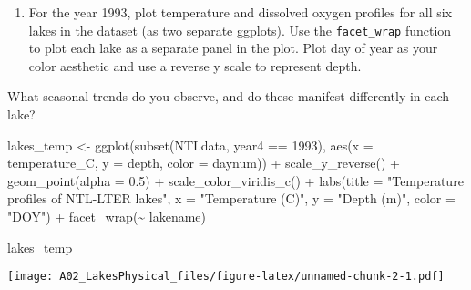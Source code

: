 \documentclass[
]{article}
\newenvironment{Shaded}{\begin{snugshade}}{\end{snugshade}}
\newcommand{\AttributeTok}[1]{\textcolor[rgb]{0.77,0.63,0.00}{#1}}
\newcommand{\DecValTok}[1]{\textcolor[rgb]{0.00,0.00,0.81}{#1}}
\newcommand{\FloatTok}[1]{\textcolor[rgb]{0.00,0.00,0.81}{#1}}
\newcommand{\FunctionTok}[1]{\textcolor[rgb]{0.00,0.00,0.00}{#1}}
\newcommand{\NormalTok}[1]{#1}
\newcommand{\OtherTok}[1]{\textcolor[rgb]{0.56,0.35,0.01}{#1}}
\newcommand{\SpecialCharTok}[1]{\textcolor[rgb]{0.00,0.00,0.00}{#1}}
\newcommand{\StringTok}[1]{\textcolor[rgb]{0.31,0.60,0.02}{#1}}
\providecommand{\tightlist}{%
  \setlength{\itemsep}{0pt}\setlength{\parskip}{0pt}}
\begin{document}
\begin{enumerate}
\def\labelenumi{\arabic{enumi}.}
\setcounter{enumi}{4}
\tightlist
\item
  For the year 1993, plot temperature and dissolved oxygen profiles for
  all six lakes in the dataset (as two separate ggplots). Use the
  \texttt{facet\_wrap} function to plot each lake as a separate panel in
  the plot. Plot day of year as your color aesthetic and use a reverse y
  scale to represent depth.
\end{enumerate}

What seasonal trends do you observe, and do these manifest differently
in each lake?

\begin{Shaded}
\begin{Highlighting}[]
\NormalTok{lakes\_temp }\OtherTok{\textless{}{-}} \FunctionTok{ggplot}\NormalTok{(}\FunctionTok{subset}\NormalTok{(NTLdata, year4 }\SpecialCharTok{==} \DecValTok{1993}\NormalTok{), }\FunctionTok{aes}\NormalTok{(}\AttributeTok{x =}\NormalTok{ temperature\_C, }\AttributeTok{y =}\NormalTok{ depth, }\AttributeTok{color =}\NormalTok{ daynum)) }\SpecialCharTok{+}
              \FunctionTok{scale\_y\_reverse}\NormalTok{() }\SpecialCharTok{+}
              \FunctionTok{geom\_point}\NormalTok{(}\AttributeTok{alpha =} \FloatTok{0.5}\NormalTok{) }\SpecialCharTok{+} 
              \FunctionTok{scale\_color\_viridis\_c}\NormalTok{() }\SpecialCharTok{+} 
              \FunctionTok{labs}\NormalTok{(}\AttributeTok{title =} \StringTok{"Temperature profiles of NTL{-}LTER lakes"}\NormalTok{,}
                   \AttributeTok{x =} \StringTok{"Temperature (C)"}\NormalTok{, }\AttributeTok{y =} \StringTok{"Depth (m)"}\NormalTok{, }\AttributeTok{color =} \StringTok{"DOY"}\NormalTok{) }\SpecialCharTok{+}
              \FunctionTok{facet\_wrap}\NormalTok{(}\SpecialCharTok{\textasciitilde{}}\NormalTok{ lakename)}

\NormalTok{lakes\_temp}
\end{Highlighting}
\end{Shaded}

\texttt{[image: A02\_LakesPhysical\_files/figure-latex/unnamed-chunk-2-1.pdf]}
\end{document}
